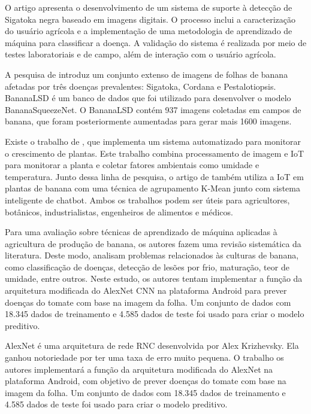 O artigo \cite{Frutcultura} apresenta o desenvolvimento de um sistema de suporte à detecção de Sigatoka negra baseado em imagens digitais. O processo inclui a caracterização do usuário agrícola e a implementação de uma metodologia de aprendizado de máquina para classificar a doença. A validação do sistema é realizada por meio de testes laboratoriais e de campo, além de interação com o usuário agrícola.

A pesquisa de \cite{DadosArt} introduz um conjunto extenso de imagens de folhas de banana afetadas por três doenças prevalentes: Sigatoka, Cordana e Pestalotiopsis. \ac{BananaLSD} é um banco de dados que foi utilizado para desenvolver o modelo BananaSqueezeNet. O \ac{BananaLSD}  contém 937 imagens coletadas em campos de banana, que foram posteriormente aumentadas para gerar mais 1600 imagens.

Existe o trabalho de \cite{Arti3}, que implementa um sistema automatizado para monitorar o crescimento de plantas. Este trabalho combina processamento de imagem e \ac{IoT} para monitorar a planta e coletar fatores ambientais como umidade e temperatura. Junto dessa linha de pesquisa, o artigo de \cite{Art4} também utiliza a \ac{IoT} em plantas de banana com uma técnica de agrupamento K-Mean junto com sistema inteligente de chatbot. Ambos os trabalhos podem ser úteis para agricultores, botânicos, industrialistas, engenheiros de alimentos e médicos.

Para uma avaliação sobre técnicas de aprendizado de máquina aplicadas à agricultura de produção de banana, os autores \cite{Art6} fazem uma revisão sistemática da literatura. Deste modo, analisam problemas relacionados às culturas de banana, como classificação de doenças, detecção de lesões por frio, maturação, teor de umidade, entre outros. Neste estudo, os autores tentam implementar a função da arquitetura modificada do AlexNet CNN na plataforma Android para prever doenças do tomate com base na imagem da folha. Um conjunto de dados com 18.345 dados de treinamento e 4.585 dados de teste foi usado para criar o modelo preditivo.

AlexNet é uma arquitetura de rede \ac{RNC} desenvolvida por Alex Krizhevsky. Ela ganhou notoriedade por ter uma taxa de erro muito pequena. O trabalho \cite{AlexNetTomat} os autores implementará a função da arquitetura modificada do AlexNet na plataforma Android, com objetivo de prever doenças do tomate com base na imagem da folha. Um conjunto de dados com 18.345 dados de treinamento e 4.585 dados de teste foi usado para criar o modelo preditivo.

